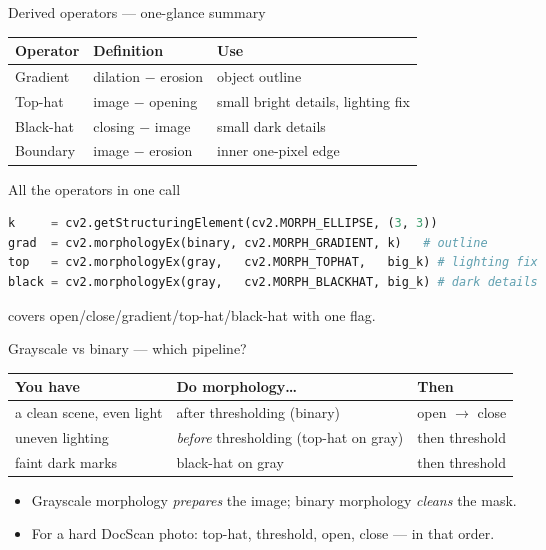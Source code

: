 \documentclass[10pt,aspectratio=169]{beamer}
\begin{document}
\begin{frame}{Derived operators — one-glance summary}
  \begin{center}
  \begin{tabular}{@{}lll@{}}
    \toprule
    \textbf{Operator} & \textbf{Definition} & \textbf{Use} \\
    \midrule
    Gradient  & dilation $-$ erosion & object outline \\
    Top-hat   & image $-$ opening    & small bright details, lighting fix \\
    Black-hat & closing $-$ image    & small dark details \\
    Boundary  & image $-$ erosion    & inner one-pixel edge \\
    \bottomrule
  \end{tabular}
  \end{center}
\end{frame}

\begin{frame}[fragile]{All the operators in one call}
\begin{lstlisting}[language=Python]
k     = cv2.getStructuringElement(cv2.MORPH_ELLIPSE, (3, 3))
grad  = cv2.morphologyEx(binary, cv2.MORPH_GRADIENT, k)   # outline
top   = cv2.morphologyEx(gray,   cv2.MORPH_TOPHAT,   big_k) # lighting fix
black = cv2.morphologyEx(gray,   cv2.MORPH_BLACKHAT, big_k) # dark details
\end{lstlisting}
   covers open/close/gradient/top-hat/black-hat with one flag.
\end{frame}

\begin{frame}{Grayscale vs binary — which pipeline?}
  \begin{center}
  \begin{tabular}{@{}lll@{}}
    \toprule
    \textbf{You have} & \textbf{Do morphology\dots} & \textbf{Then} \\
    \midrule
    a clean scene, even light & after thresholding (binary) & open $\to$ close \\
    uneven lighting & \emph{before} thresholding (top-hat on gray) & then threshold \\
    faint dark marks & black-hat on gray & then threshold \\
    \bottomrule
  \end{tabular}
  \end{center}
  \begin{itemize}
    \item Grayscale morphology \emph{prepares} the image; binary morphology \emph{cleans} the mask.
    \item For a hard DocScan photo: top-hat, threshold, open, close — in that order.
  \end{itemize}
\end{frame}
\end{document}
